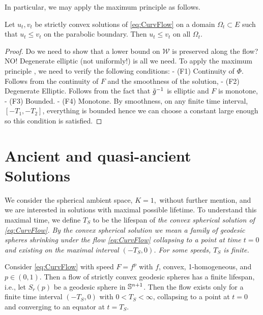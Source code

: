 \documentclass{amsart}
\begin{document}
In particular, we may apply the maximum principle \cite[Theorem 3.1.1]{Giga:2006} as follows.

\begin{theorem}
\label{thm:comparison}
Let \(u_t, v_t\) be strictly convex solutions of \eqref{eq:CurvFlow} on a domain \(\Omega_t \subset E\) such that \(u_t \leq v_t\) on the parabolic boundary. Then \(u_t \leq v_t\) on all \(\Omega_t\).
\end{theorem}

\begin{proof}
Do we need to show that a lower bound on \(\mathcal{W}\) is preserved along the flow? NO! Degenerate elliptic (not uniformly!) is all we need.
To apply the maximum principle \cite[Theorem 3.1.1]{Giga:2006}, we need to verify the following conditions:
- (F1) Continuity of \(\Phi\). Follows from the continuity of \(F\) and the smoothness of the solution,
- (F2) Degenerate Elliptic. Follows from the fact that \(\~g^{-1}\) is elliptic and \(F\) is monotone,
- (F3) Bounded.
- (F4) Monotone. By smoothness, on any finite time interval, \([-T_1, -T_2]\), everything is bounded hence we can choose a constant large enough so this condition is satisfied.
\end{proof}

\section{Ancient and quasi-ancient Solutions}
\label{sec:quasi_ancient}

We consider the spherical ambient space, $K=1,$ without further mention, and we are interested in solutions with maximal possible lifetime. To understand this maximal time, we define $T_S$ to be the lifespan of \it{the} convex spherical solution of \eqref{eq:CurvFlow}. By the convex spherical solution we mean a family of geodesic spheres shrinking under the flow \eqref{eq:CurvFlow} collapsing to a point at time $t=0$ and existing on the maximal interval \((-T_S, 0)\). For some speeds, \(T_S\) is finite.

\begin{lemma}
 Consider \eqref{eq:CurvFlow} with speed \(F = f^p\) with \(f\), convex, 1-homogeneous, and \(p \in (0,1)\). Then a flow of strictly convex geodesic spheres has a finite lifespan, i.e., let $S_r(p)$ be a geodesic sphere in $\S^{n+1}$. Then the flow exists only for a finite time interval \((-T_S,0)\) with \(0 < T_S < \infty\), collapsing to a point at \(t=0\) and converging to an equator at \(t=T_S\).
\end{lemma}
\end{document}
